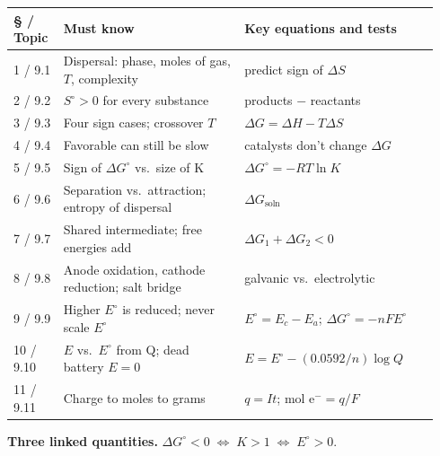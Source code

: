 \documentclass[11pt]{article}
\begin{document}
\begin{longtable}{@{}p{0.11\linewidth}p{0.40\linewidth}p{0.43\linewidth}@{}}\toprule
\S{} / Topic & Must know & Key equations and tests \\ \midrule
1 / 9.1 & Dispersal: phase, moles of gas, $T$, complexity & predict sign of $\Delta S$ \\[3pt]
2 / 9.2 & $S^\circ > 0$ for every substance & products $-$ reactants \\[3pt]
3 / 9.3 & Four sign cases; crossover $T$ & $\Delta G = \Delta H - T\Delta S$ \\[3pt]
4 / 9.4 & Favorable can still be slow & catalysts don't change $\Delta G$ \\[3pt]
5 / 9.5 & Sign of $\Delta G^\circ$ vs.\ size of K & $\Delta G^\circ = -RT\ln K$ \\[3pt]
6 / 9.6 & Separation vs.\ attraction; entropy of dispersal & $\Delta G_{\text{soln}}$ \\[3pt]
7 / 9.7 & Shared intermediate; free energies add & $\Delta G_1 + \Delta G_2 < 0$ \\[3pt]
8 / 9.8 & Anode oxidation, cathode reduction; salt bridge & galvanic vs.\ electrolytic \\[3pt]
9 / 9.9 & Higher $E^\circ$ is reduced; never scale $E^\circ$ & $E^\circ = E_c - E_a$; $\Delta G^\circ = -nFE^\circ$ \\[3pt]
10 / 9.10 & $E$ vs.\ $E^\circ$ from Q; dead battery $E = 0$ & $E = E^\circ - (0.0592/n)\log Q$ \\[3pt]
11 / 9.11 & Charge to moles to grams & $q = It$; mol e$^- = q/F$ \\ \bottomrule
\end{longtable}

\textbf{Three linked quantities.} \quad $\Delta G^\circ < 0 \;\Leftrightarrow\; K > 1 \;\Leftrightarrow\; E^\circ > 0$.
\end{document}
